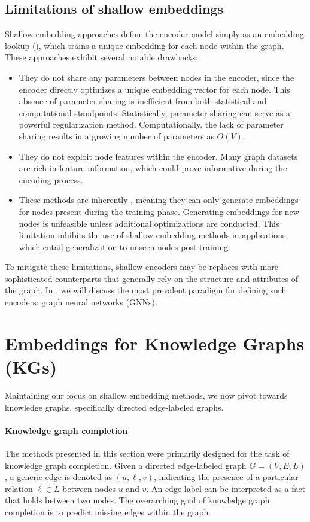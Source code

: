 \subsection{Limitations of shallow embeddings}
Shallow embedding approaches define the encoder model simply as an embedding lookup (), which trains a unique embedding for each node within the graph. These approaches exhibit several notable drawbacks:
\begin{itemize}
    \item They do not share any parameters between nodes in the encoder, since the encoder directly optimizes a unique embedding vector for each node. This absence of parameter sharing is inefficient from both statistical and computational standpoints. Statistically, parameter sharing can serve as a powerful regularization method. Computationally, the lack of parameter sharing results in a growing number of parameters as $ O(V) $.
    \item They do not exploit node features within the encoder. Many graph datasets are rich in feature information, which could prove informative during the encoding process.
    \item These methods are inherently , meaning they can only generate embeddings for nodes present during the training phase. Generating embeddings for new nodes is unfeasible unless additional optimizations are conducted. This limitation inhibits the use of shallow embedding methods in  applications, which entail generalization to unseen nodes post-training.
\end{itemize}
To mitigate these limitations, shallow encoders may be replaces with more sophisticated counterparts that generally rely on the structure and attributes of the graph. In , we will discuss the most prevalent paradigm for defining such encoders: graph neural networks (GNNs).

\section{Embeddings for Knowledge Graphs (KGs)}\label{sec:embeddingsKGs}
Maintaining our focus on shallow embedding methods, we now pivot towards knowledge graphs, specifically directed edge-labeled graphs.

\paragraph{Knowledge graph completion}
The methods presented in this section were primarily designed for the task of knowledge graph completion. Given a directed edge-labeled graph $ G = (V, E, L) $, a generic edge is denoted as $ (u,\ell,v) $, indicating the presence of a particular relation $ \ell \in L $ between nodes $ u $ and $ v $. An edge label can be interpreted as a fact that holds between two nodes. The overarching goal of knowledge graph completion is to predict missing edges within the graph.

